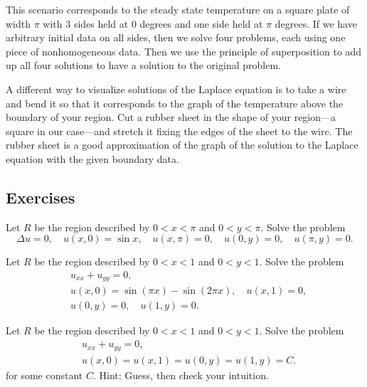 This scenario
corresponds to the steady state temperature on a square plate of width $\pi$
with 3 sides held at 0 degrees and one side held at $\pi$ degrees.
If we have arbitrary initial data on all sides, then we solve four problems,
each using one piece of nonhomogeneous data.  Then we use the principle of
superposition to add up all four solutions to have a solution to the
original problem.

A different
way to visualize solutions of the Laplace equation is to
take a wire and bend
it so that it corresponds to the graph of the
temperature above the boundary of your region.  Cut a rubber sheet in
the shape of your region---a square in our case---and stretch it
fixing the edges of the sheet to the wire.
The rubber sheet is a good approximation of the graph of the solution to
the Laplace equation with the given boundary data.

\subsection{Exercises}

\begin{exercise}
Let $R$ be the region described by $0 < x < \pi$ and $0 < y < \pi$.
Solve the problem
\begin{equation*}
\Delta u = 0, \quad u(x,0) = \sin x, \quad u(x,\pi) = 0,
\quad u(0,y) = 0, 
\quad u(\pi,y) = 0 .
\end{equation*}
\end{exercise}

\begin{exercise}
Let $R$ be the region described by $0 < x < 1$ and $0 < y < 1$.
Solve the problem
\begin{align*}
& u_{xx} + u_{yy} = 0, \\
& u(x,0) = \sin (\pi x) - \sin (2\pi x), \quad u(x,1) = 0, \\
& u(0,y) = 0, \quad u(1,y) = 0 .
\end{align*}
\end{exercise}

\begin{exercise}
Let $R$ be the region described by $0 < x < 1$ and $0 < y < 1$.
Solve the problem
\begin{align*}
& u_{xx} + u_{yy} = 0, \\
& u(x,0) = u(x,1) = u(0,y) = u(1,y) = C .
\end{align*}
for some constant $C$.  Hint: Guess, then check your intuition.
\end{exercise}

